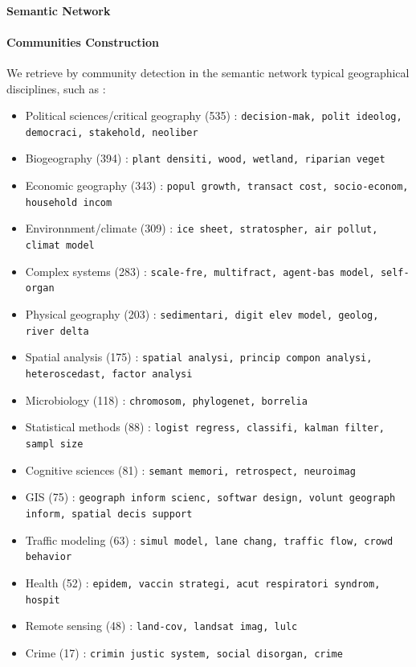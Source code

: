 \paragraph{Semantic Network}




\paragraph{Communities Construction}








We retrieve by community detection in the semantic network typical geographical disciplines, such as :

\begin{itemize}
\item Political sciences/critical geography (535) : \texttt{decision-mak, polit ideolog, democraci, stakehold, neoliber}
\item Biogeography (394) : \texttt{plant densiti, wood, wetland, riparian veget}
\item Economic geography (343) : \texttt{popul growth, transact cost, socio-econom, household incom}
\item Environnment/climate (309) : \texttt{ice sheet, stratospher, air pollut, climat model}
\item Complex systems (283) : \texttt{scale-fre, multifract, agent-bas model, self-organ}
\item Physical geography (203) : \texttt{sedimentari, digit elev model, geolog, river delta}
\item Spatial analysis (175) : \texttt{spatial analysi, princip compon analysi, heteroscedast, factor analysi}
\item Microbiology (118) : \texttt{chromosom, phylogenet, borrelia}
\item Statistical methods (88) : \texttt{logist regress, classifi, kalman filter, sampl size}
\item Cognitive sciences (81) : \texttt{semant memori, retrospect, neuroimag}
\item GIS (75) : \texttt{geograph inform scienc, softwar design, volunt geograph inform, spatial decis support}
\item Traffic modeling (63) : \texttt{simul model, lane chang, traffic flow, crowd behavior}
\item Health (52) : \texttt{epidem, vaccin strategi, acut respiratori syndrom, hospit}
\item Remote sensing (48) : \texttt{land-cov, landsat imag, lulc}
\item Crime (17) : \texttt{crimin justic system, social disorgan, crime}
\end{itemize}





